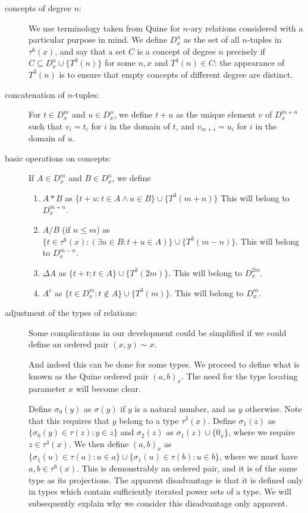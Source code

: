 \documentclass[12pt]{article}
\begin{document}
\begin{description}
\item[concepts of degree $n$:]  We use terminology taken from Quine for $n$-ary relations considered with a particular purpose in mind.  We define $D^n_x$ as the set of all $n$-tuples in $\tau^6(x)$, and say that a set $C$ is a concept of degree $n$ precisely if $C \subseteq D^n_x \cup \{T^3(n)\}$ for some $n,x$ and $T^3(n) \in C$:  the appearance
of $T^3(n)$ is to ensure that empty concepts of different degree are distinct.

\item[concatenation of $n$-tuples:]  For $t \in D^m_x$ and $u \in D^n_x$, we define $t+u$ as the unique
element $v$ of $D^{m+n}_x$ such that $v_i = t_i$ for $i$ in the domain of $t$, and $v_{m+i}=u_i$ for $i$ in the domain of $u$.

\item[basic operations on concepts:]  If $A \in D^m_x$ and $B \in D^n_x$, we define

\begin{enumerate}

\item $A*B$ as $\{t+u:t \in A \wedge u \in B\}\cup \{T^3(m+n)\}$  This will belong to $D^{m+n}_x$.

\item $A/B$ (if $n \leq m$) as $\{t \in \tau^6(x):(\exists u \in B:t+u \in A)\} \cup \{T^3(m-n)\}$.  This will belong to $D^{m-n}_x$.

\item $\Delta A$ as $\{t+t:t \in A\}\cup \{T^3(2m)\}$.  This will belong to $D^{2m}_x$.

\item $A^c$ as $\{t \in D^m_x:t \not\in A\}\cup \{T^3(m)\}$.  This will belong to $D^m_x$.

\end{enumerate}



\item[adjustment of the types of relations:]  Some complications in our development could be simplified if we could define an ordered pair $(x,y) \sim x$.

And indeed this can be done for some types.  We proceed to define what is known as the Quine ordered pair $(a,b)_x$.  The need for the type locating parameter $x$ will become clear.

Define $\sigma_0(y)$ as $\sigma(y)$ if $y$ is a natural number, and as $y$ otherwise.  Note that this requires that $y$ belong to a type $\tau^3(x)$.  Define $\sigma_1(z)$ as $\{\sigma_0(y) \in \tau(z):y \in z\}$ and $\sigma_2(z)$ as $\sigma_1(z) \cup \{0_x\}$, where we require $z \in \tau^4(x)$.  We then define
$(a,b)_x$ as $\{\sigma_1(u) \in \tau(a):u \in a\} \cup \{\sigma_1(u) \in \tau(b):u \in b\}$, where we must have $a,b \in \tau^6(x)$.  This is demonstrably an ordered pair, and it is of the same type as its projections.  The apparent disadvantage is that it is defined only in types which contain sufficiently iterated power sets of a type.   We will subsequently explain why we consider this disadvantage only apparent.


\end{description}
\end{document}
